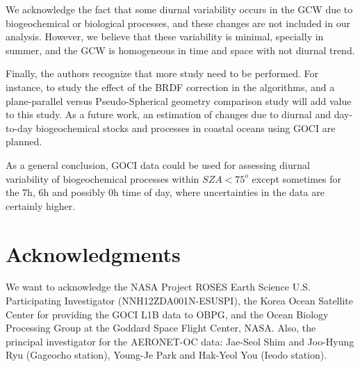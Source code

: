 \documentclass[onecolumn,3p,letterpaper,11pt]{elsarticle}
\begin{document}
We acknowledge the fact that some diurnal variability occurs in the GCW due to biogeochemical or biological processes, and these changes are not included in our analysis. However, we believe that these variability is minimal, specially in summer, and the GCW is homogeneous in time and space with not diurnal trend.

Finally, the authors recognize that more study need to be performed. For instance, to study the effect of the BRDF correction in the algorithms, and a plane-parallel versus Pseudo-Spherical geometry comparison study will add value to this study. As a future work, an estimation of changes due to diurnal and day-to-day biogeochemical stocks and processes in coastal oceans using GOCI are planned.

As a general conclusion, GOCI data could be used for assessing diurnal variability of biogeochemical processes within $SZA < 75^o$ except sometimes for the 7h, 6h and possibly 0h time of day, where uncertainties in the data are certainly higher. 


\section*{Acknowledgments}
\vspace{-.2cm}
We want to acknowledge the NASA Project ROSES Earth Science U.S. Participating Investigator (NNH12ZDA001N-ESUSPI), the Korea Ocean Satellite Center for providing the GOCI L1B data to OBPG, and the Ocean Biology Processing Group at the Goddard Space Flight Center, NASA. Also, the principal investigator for the AERONET-OC data: Jae-Seol Shim and Joo-Hyung Ryu (Gageocho station), Young-Je Park and Hak-Yeol You (Ieodo station).

\end{document}
